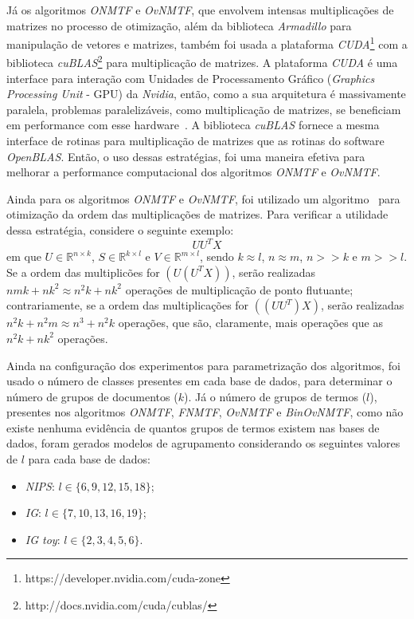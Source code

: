 \documentclass[
    12pt,                %
    oneside,            %
    a4paper,            %
    english,            %
    brazil                %
    ]{abntex2ppgsi}
\begin{document}
Já os algoritmos \textit{ONMTF} e \textit{OvNMTF}, que envolvem intensas multiplicações de matrizes no processo de otimização, além da biblioteca \textit{Armadillo} para manipulação de vetores e matrizes, também foi usada a plataforma \textit{CUDA}\footnote{https://developer.nvidia.com/cuda-zone} com a biblioteca \textit{cuBLAS}\footnote{http://docs.nvidia.com/cuda/cublas/} para multiplicação de matrizes.
A plataforma \textit{CUDA} é uma interface para interação com Unidades de Processamento Gráfico (\textit{Graphics Processing Unit} - GPU) da \textit{Nvidia}, então, como a sua arquitetura é massivamente paralela, problemas paralelizáveis, como multiplicação de matrizes, se beneficiam em performance com esse hardware~\cite{Fatahalian2004}.
A biblioteca \textit{cuBLAS} fornece a mesma interface de rotinas para multiplicação de matrizes que as rotinas do software \textit{OpenBLAS}.
Então, o uso dessas estratégias, foi uma maneira efetiva para melhorar a performance computacional dos algoritmos \textit{ONMTF} e \textit{OvNMTF}.

Ainda para os algoritmos \textit{ONMTF} e \textit{OvNMTF}, foi utilizado um algoritmo~\cite{Cormen2001} para otimização da ordem das multiplicações de matrizes.
Para verificar a utilidade dessa estratégia, considere o seguinte exemplo:
\[
    U U^T X
\]
em que $U \in \mathbb{R}^{n \times k}$, $S \in \mathbb{R}^{k \times l}$ e $V \in \mathbb{R}^{m \times l}$, sendo $k \approx l$, $n \approx m$, $n >> k$ e $m >> l$.
Se a ordem das multiplicões for $(U (U^T X))$, serão realizadas $nmk + nk^2 \approx n^2k + nk^2$ operações de multiplicação de ponto flutuante; contrariamente, se a ordem das multiplicações for $((U U^T) X)$, serão realizadas $n^2k + n^2m \approx n^3 + n^2k$ operações, que são, claramente, mais operações que as $n^2k + nk^2$ operações.

Ainda na configuração dos experimentos para parametrização dos algoritmos, foi usado o número de classes presentes em cada base de dados, para determinar o número de grupos de documentos ($k$).
Já o número de grupos de termos ($l$), presentes nos algoritmos \textit{ONMTF}, \textit{FNMTF}, \textit{OvNMTF} e \textit{BinOvNMTF}, como não existe nenhuma evidência de quantos grupos de termos existem nas bases de dados, foram gerados modelos de agrupamento considerando os seguintes valores de $l$ para cada base de dados:
\begin{itemize}
    \item \textit{NIPS}: $l \in \{6, 9, 12, 15, 18\}$;
    \item \textit{IG}: $l \in \{7, 10, 13, 16, 19\}$;
    \item \textit{IG toy}: $l \in \{2, 3, 4, 5, 6\}$.
\end{itemize}
\end{document}
